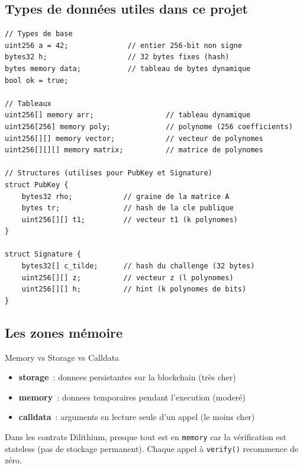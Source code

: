 \documentclass[12pt, a4paper]{article}
\begin{document}
\subsection{Types de données utiles dans ce projet}

\begin{lstlisting}[style=solidity]
// Types de base
uint256 a = 42;              // entier 256-bit non signe
bytes32 h;                   // 32 bytes fixes (hash)
bytes memory data;           // tableau de bytes dynamique
bool ok = true;

// Tableaux
uint256[] memory arr;                 // tableau dynamique
uint256[256] memory poly;             // polynome (256 coefficients)
uint256[][] memory vector;            // vecteur de polynomes
uint256[][][] memory matrix;          // matrice de polynomes

// Structures (utilises pour PubKey et Signature)
struct PubKey {
    bytes32 rho;            // graine de la matrice A
    bytes tr;               // hash de la cle publique
    uint256[][] t1;         // vecteur t1 (k polynomes)
}

struct Signature {
    bytes32[] c_tilde;      // hash du challenge (32 bytes)
    uint256[][] z;          // vecteur z (l polynomes)
    uint256[][] h;          // hint (k polynomes de bits)
}
\end{lstlisting}

\subsection{Les zones mémoire}

\begin{defbox}{Memory vs Storage vs Calldata}
\begin{itemize}
  \item \textbf{storage}~: donnees persistantes sur la blockchain (très cher)
  \item \textbf{memory}~: donnees temporaires pendant l'execution (moderé)
  \item \textbf{calldata}~: arguments en lecture seule d'un appel (le moins cher)
\end{itemize}
\end{defbox}

\begin{importantbox}
Dans les contrats Dilithium, presque tout est en \texttt{memory}
car la vérification est stateless (pas de stockage permanent).
Chaque appel à \texttt{verify()} recommence de zéro.
\end{importantbox}
\end{document}
